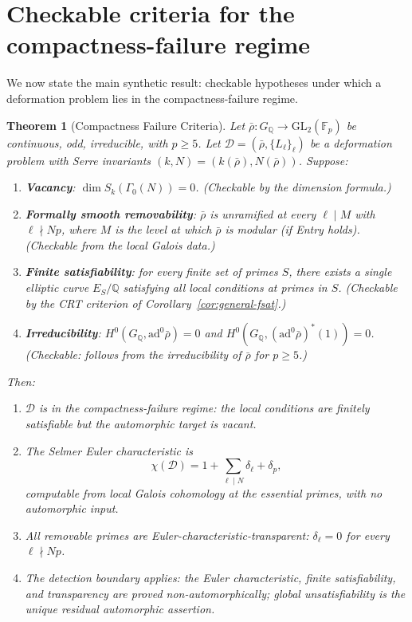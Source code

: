 \documentclass[12pt]{amsart}
\newtheorem{theorem}{Theorem}[section]
\theoremstyle{definition}
\theoremstyle{remark}
\newcommand{\GL}{\mathrm{GL}}
\newcommand{\ad}{\mathrm{ad}}
\newcommand{\rhobar}{\bar{\rho}}
\newcommand{\Fp}{\mathbb{F}_p}
\newcommand{\GQ}{G_{\mathbb{Q}}}
\begin{document}
\section{Checkable criteria for the compactness-failure regime}
\label{sec:criteria}

We now state the main synthetic result: checkable hypotheses under which a deformation problem lies in the compactness-failure regime.

\begin{theorem}[Compactness Failure Criteria]\label{thm:criteria}
Let $\rhobar : \GQ \to \GL_2(\Fp)$ be continuous, odd, irreducible, with $p \geq 5$. Let $\mathcal{D} = (\rhobar, \{L_\ell\}_\ell)$ be a deformation problem with Serre invariants $(k, N) = (k(\rhobar), N(\rhobar))$. Suppose:
\begin{enumerate}[label=\textup{(H\arabic*)}]
\item \textbf{Vacancy}: $\dim S_k(\Gamma_0(N)) = 0$. \textup{(Checkable by the dimension formula.)}
\item \textbf{Formally smooth removability}: $\rhobar$ is unramified at every $\ell \mid M$ with $\ell \nmid Np$, where $M$ is the level at which $\rhobar$ is modular (if Entry holds). \textup{(Checkable from the local Galois data.)}
\item \textbf{Finite satisfiability}: for every finite set of primes $S$, there exists a single elliptic curve $E_S / \mathbb{Q}$ satisfying all local conditions at primes in $S$. \textup{(Checkable by the CRT criterion of Corollary~\ref{cor:general-fsat}.)}
\item \textbf{Irreducibility}: $H^0(\GQ, \ad^0\rhobar) = 0$ and $H^0(\GQ, (\ad^0\rhobar)^*(1)) = 0$. \textup{(Checkable: follows from the irreducibility of $\rhobar$ for $p \geq 5$.)}
\end{enumerate}
Then:
\begin{enumerate}[label=\textup{(\alph*)}]
\item $\mathcal{D}$ is in the compactness-failure regime: the local conditions are finitely satisfiable but the automorphic target is vacant.
\item The Selmer Euler characteristic is
$$\chi(\mathcal{D}) = 1 + \sum_{\ell \mid N} \delta_\ell + \delta_p,$$
computable from local Galois cohomology at the essential primes, with no automorphic input.
\item All removable primes are Euler-characteristic-transparent: $\delta_\ell = 0$ for every $\ell \nmid Np$.
\item The detection boundary applies: the Euler characteristic, finite satisfiability, and transparency are proved non-automorphically; global unsatisfiability is the unique residual automorphic assertion.
\end{enumerate}
\end{theorem}
\end{document}
